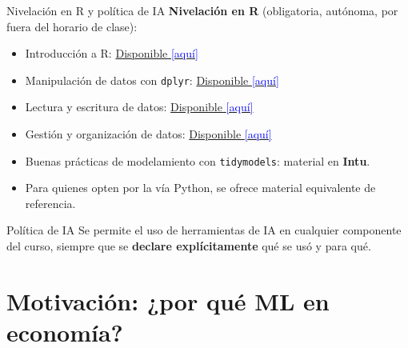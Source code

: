 \documentclass{beamer}
\newcommand{\1}{\mathbb{I}}
\begin{document}
\begin{frame}{Nivelación en R y política de IA}
\small
\textbf{Nivelación en R} (obligatoria, autónoma, por fuera del horario de clase):
\begin{itemize}\itemsep4pt
  \item Introducción a R:
  \href{https://eduard-martinez.github.io/blog/intro-R/index.html}{Disponible \textcolor{blue}{[aquí]}}
  \item Manipulación de datos con \texttt{dplyr}:
  \href{https://eduard-martinez.github.io/blog/dplyr/index.html}{Disponible \textcolor{blue}{[aquí]}}
  \item Lectura y escritura de datos:
  \href{https://eduard-martinez.github.io/blog/read_and_write_data/index.html}{Disponible \textcolor{blue}{[aquí]}}
  \item Gestión y organización de datos:
  \href{https://eduard-martinez.github.io/blog/data_managment/index.html}{Disponible \textcolor{blue}{[aquí]}}
  \item Buenas prácticas de modelamiento con \texttt{tidymodels}: material en \textbf{Intu}.
  \item Para quienes opten por la vía Python, se ofrece material equivalente de referencia.
\end{itemize}
\pause

\vspace{0.2cm}
\begin{block}{Política de IA}
Se permite el uso de herramientas de IA en cualquier componente del curso, siempre que se \textbf{declare explícitamente} qué se usó y para qué.
\end{block}
\end{frame}


\section{Motivación: ¿por qué ML en economía?}
\begin{frame}[noframenumbering]
\tableofcontents[currentsection]
\end{frame}
\end{document}
